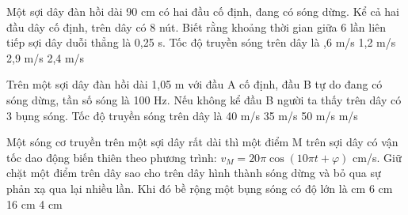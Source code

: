 \begin{vidu}%
 Một sợi dây đàn hồi dài 90 cm có hai đầu cố định, đang có sóng dừng. Kể cả hai đầu dây cố định, trên dây có 8 nút. Biết rằng khoảng thời gian giữa 6 lần liên tiếp sợi dây duỗi thẳng là 0,25 s. Tốc độ truyền sóng trên dây là
\choice
{,6 m/s}
{1,2 m/s}
{2,9 m/s}
{2,4 m/s}
\end{vidu} 
\begin{vidu}%
Trên một sợi dây đàn hồi dài 1,05 m với đầu A cố định, đầu B tự do đang có sóng dừng, tần số sóng là 100 Hz. Nếu không kể đầu B người ta thấy trên dây có 3 bụng sóng. Tốc độ truyền sóng trên dây là
\choice
{40 m/s}
{35 m/s}
{50 m/s}
{ m/s}
\end{vidu} 
\begin{vidu}%
Một sóng cơ truyền trên một sợi dây rất dài thì một điểm M trên sợi dây có vận tốc dao động biến thiên theo phương trình:  $v_M=20\pi \cos(10\pi t + \varphi )$ cm/s. Giữ chặt một điểm trên dây sao cho trên dây hình thành sóng dừng và bỏ qua sự phản xạ qua lại nhiều lần. Khi đó bề rộng một bụng sóng có độ lớn là
\choice
{ cm}
{6 cm}
{16 cm}
{4 cm}
\end{vidu} 

